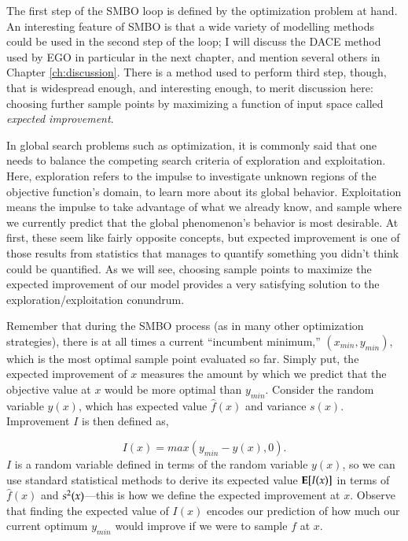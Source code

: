 The first step of the SMBO loop is defined by the optimization problem at hand. An interesting feature of SMBO is that a wide variety of modelling methods could be used in the second step of the loop; I will discuss the DACE method used by EGO in particular in the next chapter, and mention several others in Chapter \ref{ch:discussion}. There is a method used to perform third step, though, that is widespread enough, and interesting enough, to merit discussion here: choosing further sample points by maximizing a function of input space called \emph{expected improvement}. 

In global search problems such as optimization, it is commonly said that one needs to balance the competing search criteria of exploration and exploitation. Here, exploration refers to the impulse to investigate unknown regions of the objective function's domain, to learn more about its global behavior. Exploitation means the impulse to take advantage of what we already know, and sample where we currently predict that the global phenomenon's behavior is most desirable. At first, these seem like fairly opposite concepts, but expected improvement is one of those results from statistics that manages to quantify something you didn't think could be quantified. As we will see, choosing sample points to maximize the expected improvement of our model provides a very satisfying solution to the exploration/exploitation conundrum.

Remember that during the SMBO process (as in many other optimization strategies), there is at all times a current ``incumbent minimum,'' $(x_{min},y_{min})$, which is the most optimal sample point evaluated so far. Simply put, the expected improvement of $x$ measures the amount by which we predict that the objective value at $x$ would be more optimal than $y_{min}$. Consider the random variable $y(x)$, which has expected value $\hat{f}(x)$ and variance $s(x)$. Improvement $I$ is then defined as,

\begin{equation} \label{eq:improvement}
I(x) = max(y_{min}-y(x),0).
\end{equation}
$I$ is a random variable defined in terms of the random variable $y(x)$, so we can use standard statistical methods to derive its expected value $\mathbf{E}[I(x)]$ in terms of $\hat{f}(x)$ and $s^2(x)$---this is how we define the expected improvement at $x$. Observe that finding the expected value of $I(x)$ encodes our prediction of how much our current optimum $y_{min}$ would improve if we were to sample $f$ at $x$.


